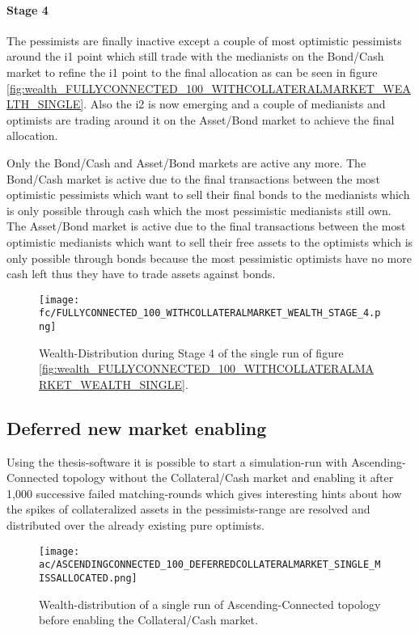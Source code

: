 \documentclass[Bachelorarbeit.tex]{subfiles}
\begin{document}
\paragraph{Stage 4}
The pessimists are finally inactive except a couple of most optimistic pessimists around the i1 point which still trade with the medianists on the Bond/Cash market to refine the i1 point to the final allocation as can be seen in figure \ref{fig:wealth_FULLYCONNECTED_100_WITHCOLLATERALMARKET_WEALTH_SINGLE}. Also the i2 is now emerging and a couple of medianists and optimists are trading around it on the Asset/Bond market to achieve the final allocation.

\medskip

Only the Bond/Cash and Asset/Bond markets are active any more. The Bond/Cash market is active due to the final transactions between the most optimistic pessimists which want to sell their final bonds to the medianists which is only possible through cash which the most pessimistic medianists still own. The Asset/Bond market is active due to the final transactions between the most optimistic medianists which want to sell their free assets to the optimists which is only possible through bonds because the most pessimistic optimists have no more cash left thus they have to trade assets against bonds.

\begin{figure}[H]
	\centering
  \texttt{[image: fc/FULLYCONNECTED\_100\_WITHCOLLATERALMARKET\_WEALTH\_STAGE\_4.png]}
  	\caption{Wealth-Distribution during Stage 4 of the single run of figure \ref{fig:wealth_FULLYCONNECTED_100_WITHCOLLATERALMARKET_WEALTH_SINGLE}.}
	\label{fig:markets_FULLYCONNECTED_100_WITHCOLLATERALMARKET_WEALTH_STAGE_4}
\end{figure}

\subsection{Deferred new market enabling}
Using the thesis-software it is possible to start a simulation-run with Ascending-Connected topology without the Collateral/Cash market and enabling it after 1,000 successive failed matching-rounds which gives interesting hints about how the spikes of collateralized assets in the pessimists-range are resolved and distributed over the already existing pure optimists.

\medskip

\begin{figure}[H]
	\centering
  \texttt{[image: ac/ASCENDINGCONNECTED\_100\_DEFERREDCOLLATERALMARKET\_SINGLE\_MISSALLOCATED.png]}
  	\caption{Wealth-distribution of a single run of Ascending-Connected topology before enabling the Collateral/Cash market.}
	\label{fig:wealth_ASCENDINGCONNECTED_100_DEFERREDCOLLATERALMARKET_SINGLE_MISSALLOCATED}
\end{figure}
\end{document}
